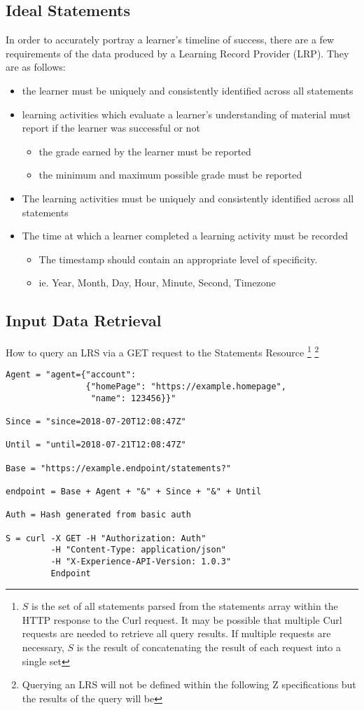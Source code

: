 \documentclass{article}
\begin{document}
\subsection{Ideal Statements}
In order to accurately portray a learner's timeline of success, there are a few requirements of the data produced by a Learning Record Provider (LRP). They are as follows:
\begin{itemize}
\item the learner must be uniquely and consistently identified across
  all statements
\item learning activities which evaluate a learner's understanding of material must report if the learner was successful or not
  \begin{itemize}
  \item the grade earned by the learner must be reported
  \item the minimum and maximum possible grade must be reported
  \end{itemize}
\item The learning activities must be uniquely and consistently identified across all statements
\item The time at which a learner completed a learning activity must be recorded
  \begin{itemize}
  \item The timestamp should contain an appropriate level of specificity.
  \item ie. Year, Month, Day, Hour, Minute, Second, Timezone
  \end{itemize}
\end{itemize}

\subsection{Input Data Retrieval}
How to query an LRS via a GET request to the Statements Resource
\footnote{\label{moreLink} $S$ is the set of all statements parsed
  from the statements array within the HTTP response to the Curl
  request. It may be possible that multiple Curl requests are needed
  to retrieve all query results. If multiple requests are necessary,
  $S$ is the result of concatenating the result of each request into
  a single set}
\footnote{\label{noZ} Querying an LRS will not be defined within the
  following Z specifications but the results of the query will be}

\begin{lstlisting}[frame=single]
Agent = "agent={"account":
                {"homePage": "https://example.homepage",
                 "name": 123456}}"

Since = "since=2018-07-20T12:08:47Z"

Until = "until=2018-07-21T12:08:47Z"

Base = "https://example.endpoint/statements?"

endpoint = Base + Agent + "&" + Since + "&" + Until

Auth = Hash generated from basic auth

S = curl -X GET -H "Authorization: Auth"
         -H "Content-Type: application/json"
         -H "X-Experience-API-Version: 1.0.3"
         Endpoint
\end{lstlisting}
\end{document}
